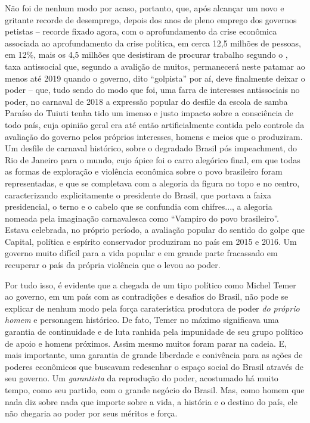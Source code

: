 Não foi de nenhum modo por acaso, portanto, que, após alcançar um novo e
gritante recorde de desemprego, depois dos anos de pleno emprego dos
governos petistas -- recorde fixado agora, com o aprofundamento da crise
econômica associada ao aprofundamento da crise política, em cerca 12,5 milhões
de pessoas, em 12\%, mais os 4,5 milhões que desistiram de procurar
trabalho segundo o , taxa antissocial que, segundo a avalição de
muitos, permanecerá neste patamar ao menos até 2019 quando o governo,
dito ``golpista'' por aí, deve finalmente deixar o poder -- que,
tudo sendo do modo que foi, uma farra de interesses antissociais no
poder, no carnaval de 2018 a expressão popular do desfile da escola de
samba Paraíso do Tuiuti tenha tido um imenso e justo
impacto sobre a consciência de todo país, cuja opinião geral era até
então artificialmente contida pelo controle da avaliação do governo
pelos próprios interesses, homens e meios que o produziram. Um desfile
de carnaval histórico, sobre o degradado Brasil pós impeachment,
do Rio de Janeiro para o mundo, cujo
ápice foi o carro alegórico final, em que todas as formas de exploração
e violência econômica sobre o povo brasileiro foram representadas, e que
se completava com a alegoria da figura no topo e no centro, caracterizando
explicitamente o presidente do Brasil, que portava a faixa presidencial,
o terno e o cabelo que se confundia com chifres..., a alegoria nomeada
pela imaginação carnavalesca como ``Vampiro do povo brasileiro''. Estava
celebrada, no próprio período, a avaliação popular do sentido do golpe
que Capital, política e espírito conservador produziram no país em 2015
e 2016. Um governo muito difícil para a vida popular e em grande parte
fracassado em recuperar o país da própria violência que o levou ao
poder.

Por tudo isso, é evidente que a chegada de um tipo político como Michel
Temer ao governo, em um país com as contradições e desafios do Brasil,
não pode se explicar de nenhum modo pela força caraterística produtora
de poder \emph{do próprio homem} e personagem histórico. De fato, Temer
no máximo significava uma garantia de continuidade e de luta ranhida
pela impunidade de seu grupo político de apoio e homens próximos.
Assim mesmo muitos foram parar na cadeia. E, mais importante, uma garantia de
grande liberdade e conivência para as ações de poderes econômicos que
buscavam redesenhar o espaço social do Brasil através de seu governo. Um
\emph{garantista} da reprodução do poder, acostumado há muito tempo,
como seu partido, com o grande negócio do Brasil. Mas, como homem que
nada diz sobre nada que importe sobre a vida, a história e o destino do
país, ele não chegaria ao poder por seus méritos e força.

